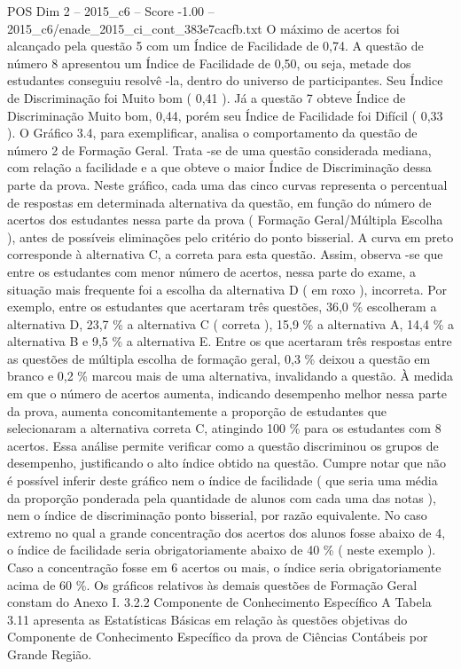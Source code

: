 \begin{textsample}{POS Dim 2 – 2015\_c6 – Score -1.00 – 2015\_c6/enade\_2015\_ci\_cont\_383e7cacfb.txt}
O máximo de acertos foi alcançado pela questão 5 com um Índice de Facilidade de 0,74.
A questão de número 8 apresentou um Índice de Facilidade de 0,50, ou seja, metade dos estudantes conseguiu resolvê -la, dentro do universo de participantes.
Seu Índice de Discriminação foi Muito bom ( 0,41 ).
Já a questão 7 obteve Índice de Discriminação Muito bom, 0,44, porém seu Índice de Facilidade foi Difícil ( 0,33 ).
O Gráfico 3.4, para exemplificar, analisa o comportamento da questão de número 2 de Formação Geral.
Trata -se de uma questão considerada mediana, com relação a facilidade e a que obteve o maior Índice de Discriminação dessa parte da prova.
Neste gráfico, cada uma das cinco curvas representa o percentual de respostas em determinada alternativa da questão, em função do número de acertos dos estudantes nessa parte da prova ( Formação Geral/Múltipla Escolha ), antes de possíveis eliminações pelo critério do ponto bisserial.
A curva em preto corresponde à alternativa C, a correta para esta questão.
Assim, observa -se que entre os estudantes com menor número de acertos, nessa parte do exame, a situação mais frequente foi a escolha da alternativa D ( em roxo ), incorreta.
Por exemplo, entre os estudantes que acertaram três questões, 36,0 \% escolheram a alternativa D, 23,7 \% a alternativa C ( correta ), 15,9 \% a alternativa A, 14,4 \% a alternativa B e 9,5 \% a alternativa E.
Entre os que acertaram três respostas entre as questões de múltipla escolha de formação geral, 0,3 \% deixou a questão em branco e 0,2 \% marcou mais de uma alternativa, invalidando a questão.
À medida em que o número de acertos aumenta, indicando desempenho melhor nessa parte da prova, aumenta concomitantemente a proporção de estudantes que selecionaram a alternativa correta C, atingindo 100 \% para os estudantes com 8 acertos.
Essa análise permite verificar como a questão discriminou os grupos de desempenho, justificando o alto índice obtido na questão.
Cumpre notar que não é possível inferir deste gráfico nem o índice de facilidade ( que seria uma média da proporção ponderada pela quantidade de alunos com cada uma das notas ), nem o índice de discriminação ponto bisserial, por razão equivalente.
No caso extremo no qual a grande concentração dos acertos dos alunos fosse abaixo de 4, o índice de facilidade seria obrigatoriamente abaixo de 40 \% ( neste exemplo ).
Caso a concentração fosse em 6 acertos ou mais, o índice seria obrigatoriamente acima de 60 \%.
Os gráficos relativos às demais questões de Formação Geral constam do Anexo I. 3.2.2 Componente de Conhecimento Específico A Tabela 3.11 apresenta as Estatísticas Básicas em relação às questões objetivas do Componente de Conhecimento Específico da prova de Ciências Contábeis por Grande Região.

\end{textsample}

